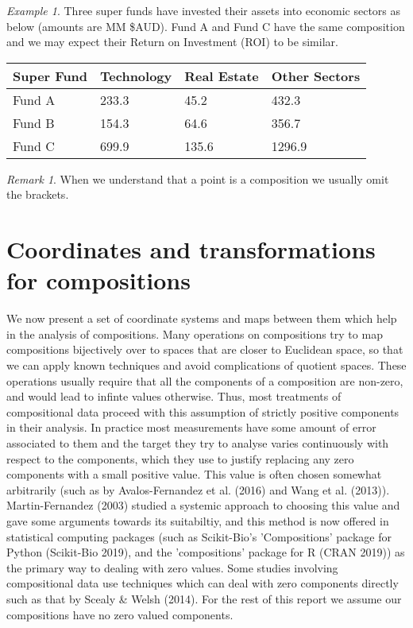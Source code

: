 \documentclass[BSc]{usydthesis}
\numberwithin{equation}{chapter}
\theoremstyle{remark}
\newtheorem{Remark}[equation]{Remark}
\newtheorem{Example}[equation]{Example}
\begin{document}
\begin{Example}
Three super funds have invested their assets into economic sectors as below (amounts are MM \$AUD). Fund A and Fund C have the same composition and we may expect their Return on Investment (ROI) to be similar. 
 \begin{table}[hbt!]
\centering
\begin{tabular}{|l|l|l|l|} 
\hline
Super Fund & Technology & Real Estate & Other Sectors   \\ 
\hline
Fund A     & 233.3      & 45.2        & 432.3           \\
Fund B     & 154.3      & 64.6        & 356.7           \\
Fund C     & 699.9      & 135.6       & 1296.9          \\
\hline
\end{tabular}
\end{table}
\end{Example}
\begin{Remark}
When we understand that a point is a composition we usually omit the brackets. 
\end{Remark}

\section{Coordinates and transformations for compositions}

We now present a set of coordinate systems and maps between them which help in the analysis of compositions. Many operations on compositions try to map compositions bijectively over to spaces that are closer to Euclidean space, so that we can apply known techniques and avoid complications of quotient spaces. These operations usually require that all the components of a composition are non-zero, and would lead to infinte values otherwise. Thus, most treatments of compositional data proceed with this assumption of strictly positive components in their analysis. In practice most measurements have some amount of error associated to them and the target they try to analyse varies continuously with respect to the components, which they use to justify replacing any zero components with a small positive value. This value is often chosen somewhat arbitrarily (such as by Avalos-Fernandez et al. (2016) and Wang et al. (2013)). Martin-Fernandez (2003) studied a systemic approach to choosing this value and gave some arguments towards its suitabiltiy, and this method is now offered in statistical computing packages (such as Scikit-Bio's 'Compositions' package for Python (Scikit-Bio 2019), and the 'compositions' package for R (CRAN 2019)) as the primary way to dealing with zero values. Some studies involving compositional data use techniques which can deal with zero components directly such as that by Scealy \& Welsh (2014). For the rest of this report we assume our compositions have no zero valued components. 
\end{document}
